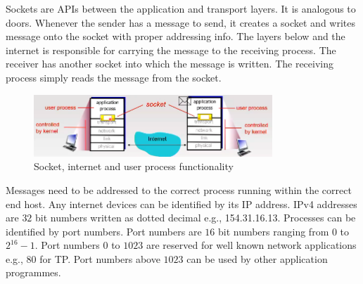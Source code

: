 \documentclass[a4paper]{article}
\theoremstyle{plain}
\theoremstyle{definition}
\newtheorem{defn}{Definition}[section]
\theoremstyle{remark}
\begin{document}
\begin{tcolorbox}[colback=black!3!white,colframe=black!60!white,title=\begin{defn}Sockets \label{Sockets}\end{defn}]
Sockets are APIs between the application and transport layers. It is analogous to doors. Whenever the sender has a message to send, it creates a socket and writes message onto the socket with proper addressing info. The layers below and the internet is responsible for carrying the message to the receiving process. The receiver has another socket into which the message is written. The receiving process simply reads the message from the socket.
\begin{figure}[H]
	\centering
	\includegraphics[width=0.8\textwidth]{twentyfour.png}
	\caption{Socket, internet and user process functionality}
	\label{fig:twentyfour-png}
\end{figure}
\end{tcolorbox}
\begin{tcolorbox}[colback=black!3!white,colframe=black!60!white,title=\begin{defn}Addressing Processes \label{Addressing Processes}\end{defn}]
Messages need to be addressed to the correct process running within the correct end host. Any internet devices can be identified by its IP address. IPv4 addresses are $32$ bit numbers written as dotted decimal e.g., 154.31.16.13. Processes can be identified by port numbers. Port numbers are $16$ bit numbers ranging from $0$ to $2^{16}-1$. Port numbers $0$ to $1023$ are reserved for well known network applications e.g., $80$ for TP. Port numbers above $1023$ can be used by other application programmes.
\end{tcolorbox}
\end{document}
